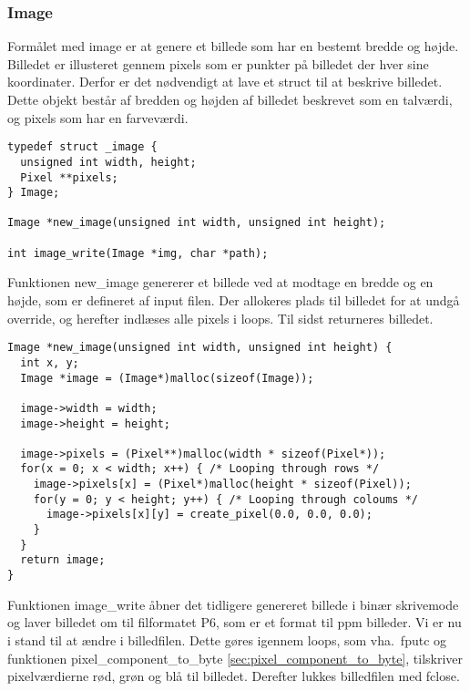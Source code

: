\subsubsection{Image}
Formålet med image er at genere et billede som har en bestemt bredde og højde. Billedet er illusteret gennem pixels som er punkter på billedet der hver sine koordinater. Derfor er det nødvendigt at lave et struct til at beskrive billedet. Dette objekt består af bredden og højden af billedet beskrevet som en talværdi, og pixels som har en farveværdi.

\begin{lstlisting}[style=Cstyle, caption=light struct]
typedef struct _image {
  unsigned int width, height;
  Pixel **pixels;
} Image;

Image *new_image(unsigned int width, unsigned int height);

int image_write(Image *img, char *path);
\end{lstlisting}

Funktionen new\_image genererer et billede ved at modtage en bredde og en højde, som er defineret af input filen. Der allokeres plads til billedet for at undgå override, og herefter indlæses alle pixels i loops. Til sidst returneres billedet.

\begin{lstlisting}[style=Cstyle, caption=light struct]
Image *new_image(unsigned int width, unsigned int height) {
  int x, y;
  Image *image = (Image*)malloc(sizeof(Image));
  
  image->width = width;
  image->height = height;

  image->pixels = (Pixel**)malloc(width * sizeof(Pixel*));
  for(x = 0; x < width; x++) { /* Looping through rows */
    image->pixels[x] = (Pixel*)malloc(height * sizeof(Pixel));
    for(y = 0; y < height; y++) { /* Looping through coloums */
      image->pixels[x][y] = create_pixel(0.0, 0.0, 0.0);
    }
  }
  return image;
}
\end{lstlisting}

Funktionen image\_write åbner det tidligere genereret billede i binær skrivemode og laver billedet om til filformatet P6, som er et format til ppm billeder. Vi er nu i stand til at ændre i billedfilen. Dette gøres igennem loops, som vha.\ fputc og funktionen pixel\_component\_to\_byte \ref{sec:pixel_component_to_byte}, tilskriver pixelværdierne rød, grøn og blå til billedet. Derefter lukkes billedfilen med fclose.  

